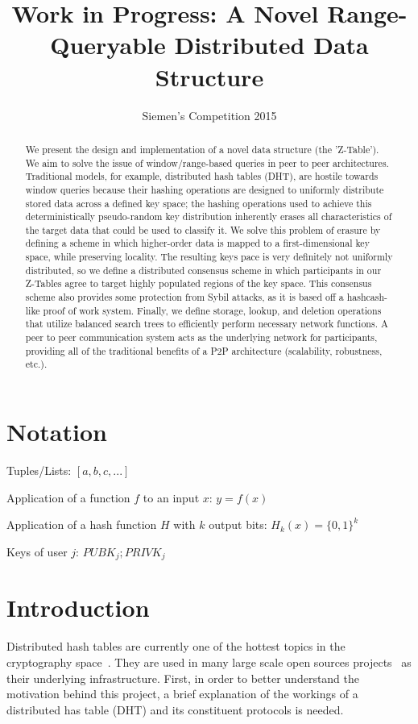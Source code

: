 \documentclass[12pt]{IEEEtran}
\title{Work in Progress: A Novel Range-Queryable Distributed Data Structure}
\author{Siemen's Competition 2015}
\date{\vspace{-5ex}}
\begin{document}
\maketitle

\begin{abstract}
We present the design and implementation of a novel data structure (the 'Z-Table'). We aim to solve the issue of window/range-based queries in peer to peer architectures. Traditional models, for example,  distributed hash tables (DHT), are hostile towards window queries because their hashing operations are designed to uniformly distribute stored data across a defined key space; the hashing operations used to achieve this deterministically pseudo-random key distribution inherently erases all characteristics of the target data that could be used to classify it. We solve this problem of erasure by defining a scheme in which higher-order data is mapped to a first-dimensional key space, while preserving locality. The resulting keys pace is very definitely not uniformly distributed, so we define a distributed consensus scheme in which participants in our Z-Tables agree to target highly populated regions of the key space. This consensus scheme also provides some protection from Sybil attacks, as it is based off a hashcash-like proof of work system. Finally, we define storage, lookup, and deletion operations that utilize balanced search trees to efficiently perform necessary network functions. A peer to peer communication system acts as the underlying network for participants, providing all of the traditional benefits of a P2P architecture (scalability, robustness, etc.).
\end{abstract}


\section{Notation}

\noindent Tuples/Lists: $[a,b,c,...]$

\noindent Application of a function $f$ to an input $x$: $y=f(x)$

\noindent Application of a hash function $H$ with $k$ output bits: $H_{k}(x) = \{0,1\}^k$

\noindent Keys of user $j$: $ PUBK_j; PRIVK_j $

 
\section{Introduction}
\par Distributed hash tables are currently one of the hottest topics in the cryptography space~\cite{Stoica:2001dj,Rowstron:2001ea,Ratnasamy:2001wn}. They are used in many large scale open sources projects~\cite{Freitas:2013tb,Xu:2010vs,Perfitt:2010fh} as their underlying infrastructure. First, in order to better understand the motivation behind this project, a brief explanation of the workings of a distributed has table (DHT) and its constituent protocols is needed.
\end{document}
